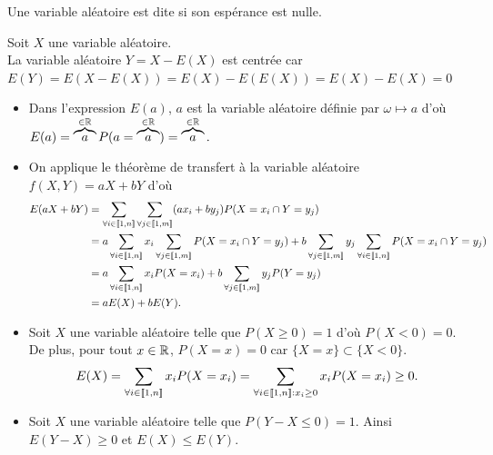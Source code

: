 \documentclass{book}
\begin{document}
\begin{Definition}[Centrée]
Une variable aléatoire est dite  si son espérance est nulle.
\end{Definition}
\begin{Exemple}
Soit $X$ une variable aléatoire.\\
La variable aléatoire $Y=X-E(X)$ est centrée car $E(Y)=E(X-E(X))=E(X)-E(E(X))=E(X)-E(X)=0$
\end{Exemple}
\begin{Demonstration}
\begin{itemize}
\item Dans l'expression $E(a)$,  $a$ est la variable aléatoire  définie par $\omega\mapsto a$  d'où $E(a )=\overbrace{a}^{\in\mathbb{R}}P(a=\overbrace{a}^{\in\mathbb{R}})=\overbrace{a}^{\in\mathbb{R}}.$\\
\item On applique le théorème de transfert à la variable aléatoire $f(X,Y)=aX+bY$ d'où
$$\begin{aligned}
 E(aX+bY) &= \sum_{ \forall i\in  \Intf{1}{n}}\sum_{ \forall j\in  \Intf{1}{m}} (ax_i+b y_j) P(X=x_i\cap Y=y_j )\\
       &=  a\sum_{ \forall i\in  \Intf{1}{n}}x_i\sum_{ \forall j\in  \Intf{1}{m}} P(X=x_i\cap Y=y_j )+b\sum_{ \forall j\in  \Intf{1}{m}} y_j \sum_{ \forall i\in  \Intf{1}{n}}P(X=x_i\cap Y=y_j )
 \\
       &=  a\sum_{ \forall i\in  \Intf{1}{n}}x_i P(X=x_i )+b\sum_{ \forall j\in  \Intf{1}{m}}  y_jP( Y=y_j )\\
       &=  aE(X)+bE(Y).
\end{aligned}$$
\item  Soit $X$ une variable aléatoire telle que $P(X\geq 0)=1$ d'où $P(X< 0)=0$.\\
De plus, pour tout $x\in \mathbb{R}$, $P(X=x)=0$ car $\{X=x\}\subset \{X< 0\}$.\\
\[ E(X) = \sum_{\forall i\in  \mathopen\lbrack\!\lbrack1,n \mathclose\rbrack\!\rbrack } x_i P(X=x_i)= \sum_{\forall i\in  \mathopen\lbrack\!\lbrack1,n \mathclose\rbrack\!\rbrack: x_i\geq 0 } x_i P(X=x_i)\geq 0.\]
\item Soit $X$ une variable aléatoire telle que $P(Y- X\leq 0)=1$. Ainsi $E(Y- X)\geq 0$ et $E(X)\leq E(Y)$.
\end{itemize}
\end{Demonstration}
%
\end{document}
